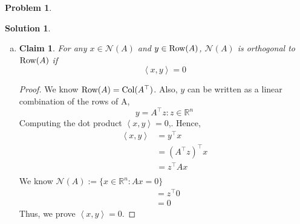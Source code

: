 \documentclass{amsart}[11pt]
\newtheorem*{claim}{Claim}
\theoremstyle{definition}
\newtheorem{problem}{Problem}
\newtheorem{solution}{Solution}
\newcommand{\R}{\mathbb{R}}
\newcommand{\bracket}[1]{\left\langle#1\right\rangle}
\newcommand{\col}{\textnormal{Col}}
\newcommand{\row}{\textnormal{Row}}
\begin{document}
\begin{problem}
\begin{solution}
\begin{enumerate}[(a)]
\begin{proof}
            \noindent Since both inclusions hold, we can conclude $\boldsymbol{\mathcal{N}(A^\top A)=\mathcal{N}(A)}$.
        \end{proof}
        \vspace{\baselineskip}
        \item \begin{claim}
        For any $x\in\mathcal{N}(A)$ and $y\in \row(A)$, $\mathcal{N}(A)$ is orthogonal to $\row(A)$ if
        \[\bracket{x,y}=0\]
        \end{claim}
        \begin{proof}
            We know $\row(A) = \col(A^\top)$. Also, $y$ can be written as a linear combination of the rows of A, 
            \[y=A^\top z : z\in\R^n\]
            Computing the dot product $\bracket{x,y} = 0$,. Hence, 
            \begin{align*}
            	\bracket{x,y} &= y^\top x \\
                &= (A^\top z)^\top x \\
                &= z^\top Ax \\
            \end{align*}
            We know $\mathcal{N}(A):=\{x\in\R^n:Ax=0\}$
            \begin{align*}
                &= z^\top 0 \\
                &= 0 
            \end{align*}
            Thus, we prove $\bracket{x,y} = 0$. 
            

\end{proof}
\end{enumerate}
\end{solution}
\end{problem}
\end{document}
